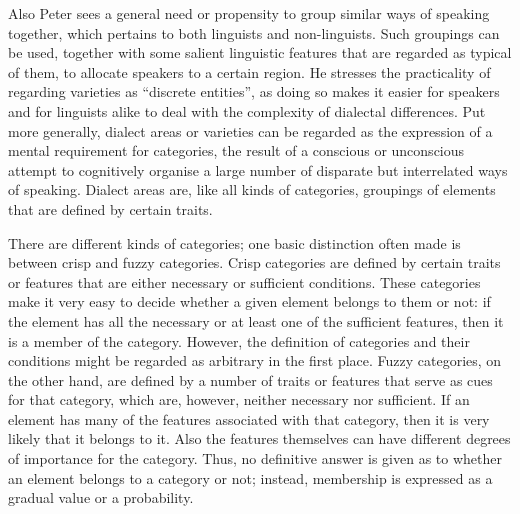 \documentclass[output=paper]{LSP/langsci}
\begin{document}
Also Peter \citet[807]{wiesinger_einteilung_1983} sees a general need or propensity to group similar ways of speaking together, which pertains to both linguists and non-linguists. Such groupings can be used, together with some salient linguistic features that are regarded as typical of them, to allocate speakers to a certain region. He stresses the practicality of regarding varieties as “discrete entities”, as doing so makes it easier for speakers and for linguists alike to deal with the complexity of dialectal differences. Put more generally, dialect areas or varieties can be regarded as the expression of a mental requirement for categories, the result of a conscious or unconscious attempt to cognitively organise a large number of disparate but interrelated ways of speaking. Dialect areas are, like all kinds of categories, groupings of elements that are defined by certain traits.

There are different kinds of categories; one basic distinction often made is between crisp and fuzzy categories. Crisp categories are defined by certain traits or features that are either necessary or sufficient conditions. These categories make it very easy to decide whether a given element belongs to them or not: if the element has all the necessary or at least one of the sufficient features, then it is a member of the category. However, the definition of categories and their conditions might be regarded as arbitrary in the first place. Fuzzy categories, on the other hand, are defined by a number of traits or features that serve as cues for that category, which are, however, neither necessary nor sufficient. If an element has many of the features associated with that category, then it is very likely that it belongs to it. Also the features themselves can have different degrees of importance for the category. Thus, no definitive answer is given as to whether an element belongs to a category or not; instead, membership is expressed as a gradual value or a probability. 
\end{document}
